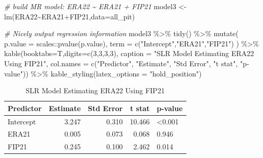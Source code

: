 \documentclass[
  11pt,
]{book}
\newenvironment{Shaded}{\begin{snugshade}}{\end{snugshade}}
\newcommand{\AttributeTok}[1]{\textcolor[rgb]{0.77,0.63,0.00}{#1}}
\newcommand{\CommentTok}[1]{\textcolor[rgb]{0.56,0.35,0.01}{\textit{#1}}}
\newcommand{\DecValTok}[1]{\textcolor[rgb]{0.00,0.00,0.81}{#1}}
\newcommand{\FunctionTok}[1]{\textcolor[rgb]{0.00,0.00,0.00}{#1}}
\newcommand{\NormalTok}[1]{#1}
\newcommand{\OtherTok}[1]{\textcolor[rgb]{0.56,0.35,0.01}{#1}}
\newcommand{\SpecialCharTok}[1]{\textcolor[rgb]{0.00,0.00,0.00}{#1}}
\newcommand{\StringTok}[1]{\textcolor[rgb]{0.31,0.60,0.02}{#1}}
\theoremstyle{definition}
\theoremstyle{definition}
\theoremstyle{definition}
\theoremstyle{definition}
\theoremstyle{remark}
\begin{document}
\begin{Shaded}
\begin{Highlighting}[]
\CommentTok{\# build MR model: ERA22 \textasciitilde{} ERA21 + FIP21}
\NormalTok{model3 }\OtherTok{\textless{}{-}} \FunctionTok{lm}\NormalTok{(ERA22}\SpecialCharTok{\textasciitilde{}}\NormalTok{ERA21}\SpecialCharTok{+}\NormalTok{FIP21,}\AttributeTok{data=}\NormalTok{all\_pit)}

\CommentTok{\# Nicely output regression information}
\NormalTok{model3 }\SpecialCharTok{\%\textgreater{}\%} \FunctionTok{tidy}\NormalTok{() }\SpecialCharTok{\%\textgreater{}\%}
  \FunctionTok{mutate}\NormalTok{(}
    \AttributeTok{p.value =}\NormalTok{ scales}\SpecialCharTok{::}\FunctionTok{pvalue}\NormalTok{(p.value),}
    \AttributeTok{term =} \FunctionTok{c}\NormalTok{(}\StringTok{"Intercept"}\NormalTok{,}\StringTok{"ERA21"}\NormalTok{,}\StringTok{"FIP21"}\NormalTok{)}
\NormalTok{  ) }\SpecialCharTok{\%\textgreater{}\%}
  \FunctionTok{kable}\NormalTok{(}\AttributeTok{booktabs=}\NormalTok{T,}\AttributeTok{digits=}\FunctionTok{c}\NormalTok{(}\DecValTok{3}\NormalTok{,}\DecValTok{3}\NormalTok{,}\DecValTok{3}\NormalTok{,}\DecValTok{3}\NormalTok{), }
        \AttributeTok{caption =} \StringTok{"SLR Model Estimating ERA22 Using FIP21"}\NormalTok{,}
        \AttributeTok{col.names =} \FunctionTok{c}\NormalTok{(}\StringTok{"Predictor"}\NormalTok{, }\StringTok{"Estimate"}\NormalTok{, }\StringTok{"Std Error"}\NormalTok{, }\StringTok{"t stat"}\NormalTok{, }\StringTok{"p{-}value"}\NormalTok{)) }\SpecialCharTok{\%\textgreater{}\%}
  \FunctionTok{kable\_styling}\NormalTok{(}\AttributeTok{latex\_options =} \StringTok{"hold\_position"}\NormalTok{)}
\end{Highlighting}
\end{Shaded}

\begin{table}[!h]

\caption{\label{tab:unnamed-chunk-190}SLR Model Estimating ERA22 Using FIP21}
\centering
\begin{tabular}[t]{lrrrl}
\toprule
Predictor & Estimate & Std Error & t stat & p-value\\
\midrule
Intercept & 3.247 & 0.310 & 10.466 & <0.001\\
ERA21 & 0.005 & 0.073 & 0.068 & 0.946\\
FIP21 & 0.245 & 0.100 & 2.462 & 0.014\\
\bottomrule
\end{tabular}
\end{table}
\end{document}
